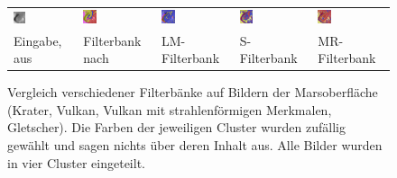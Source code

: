 \begin{figure}[h!]
\begin{tabular}{p{}p{}p{}p{}p{}}
	\includegraphics[width=0.2\textwidth]{images/Gre13_05.jpg} &
	\includegraphics[width=0.2\textwidth]{images/gen/GEN_filterbanks_Gre13_05_TSUGF.png} &
	\includegraphics[width=0.2\textwidth]{images/gen/GEN_filterbanks_Gre13_05_LM.png} &
	\includegraphics[width=0.2\textwidth]{images/gen/GEN_filterbanks_Gre13_05_S.png} &
	\includegraphics[width=0.2\textwidth]{images/gen/GEN_filterbanks_Gre13_05_MR.png} \\
	
	\hspace{1pt}\newline\centering Eingabe, aus \cite{greeley_13} &
	\hspace{1pt}\newline\centering Filterbank nach \cite{jain_91} &
	\hspace{1pt}\newline\centering LM-Filterbank \cite{leung_01} &
	\hspace{1pt}\newline\centering S-Filterbank \cite{schmid_01} &
	\hspace{1pt}\newline\centering MR-Filterbank \cite{visgeo} \\
\end{tabular}
\caption{Vergleich verschiedener Filterbänke auf Bildern der Marsoberfläche (Krater, Vulkan, Vulkan mit strahlenförmigen Merkmalen, Gletscher). Die Farben der jeweiligen Cluster wurden zufällig gewählt und sagen nichts über deren Inhalt aus. Alle Bilder wurden in vier Cluster eingeteilt.}
\label{fig:filterbank_comparision}
\end{figure}

